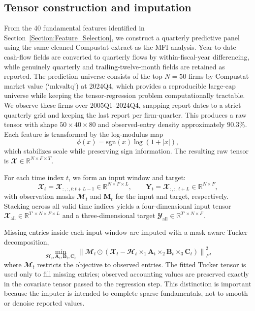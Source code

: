 \documentclass[pdflatex,sn-mathphys-num]{sn-jnl}%
\theoremstyle{thmstyleone}%
\theoremstyle{thmstyletwo}%
\theoremstyle{thmstylethree}%
\begin{document}
\subsection{Tensor construction and imputation}
\label{Section:Tensor_Imputation}

From the 40 fundamental features identified in Section~\ref{Section:Feature_Selection}, we construct a quarterly predictive panel using the same cleaned Compustat extract as the MFI analysis. Year-to-date cash-flow fields are converted to quarterly flows by within-fiscal-year differencing, while genuinely quarterly and trailing-twelve-month fields are retained as reported. The prediction universe consists of the top $N=50$ firms by Compustat market value (`mkvaltq') at 2024Q4, which provides a reproducible large-cap universe while keeping the tensor-regression problem computationally tractable. We observe these firms over 2005Q1--2024Q4, snapping report dates to a strict quarterly grid and keeping the last report per firm-quarter. This produces a raw tensor with shape $50 \times 40 \times 80$ and observed-entry density approximately $90.3\%$. Each feature is transformed by the log-modulus map
\begin{equation}
\phi(x) = \mathrm{sgn}(x)\log(1 + |x|),
\end{equation}
which stabilizes scale while preserving sign information. The resulting raw tensor is $\mathbfcal{X} \in \mathbb{R}^{N \times F \times T}$.

For each time index $t$, we form an input window and target:
\begin{equation}
\mathbfcal{X}_t = \mathbfcal{X}_{:,:,t:t+L-1} \in \mathbb{R}^{N \times F \times L},
\qquad
\mathbf{Y}_t = \mathbfcal{X}_{:,:,t+L} \in \mathbb{R}^{N \times F},
\end{equation}
with observation masks $\mathbfcal{M}_t$ and $\mathbf{M}_t$ for the input and target, respectively. Stacking across all valid time indices yields a four-dimensional input tensor $\mathbfcal{X}_{\mathrm{all}} \in \mathbb{R}^{T' \times N \times F \times L}$ and a three-dimensional target $\mathbfcal{Y}_{\mathrm{all}} \in \mathbb{R}^{T' \times N \times F}$.

Missing entries inside each input window are imputed with a mask-aware Tucker decomposition,
\begin{equation}
\min_{\mathbfcal{H}_t,\mathbf{A}_t,\mathbf{B}_t,\mathbf{C}_t}
\left\| \mathbfcal{M}_t \odot \left(\mathbfcal{X}_t -
\mathbfcal{H}_t \times_1 \mathbf{A}_t \times_2 \mathbf{B}_t \times_3 \mathbf{C}_t \right) \right\|_F^2,
\end{equation}
where $\mathbfcal{M}_t$ restricts the objective to observed entries. The fitted Tucker tensor is used only to fill missing entries; observed accounting values are preserved exactly in the covariate tensor passed to the regression step. This distinction is important because the imputer is intended to complete sparse fundamentals, not to smooth or denoise reported values.
\end{document}
